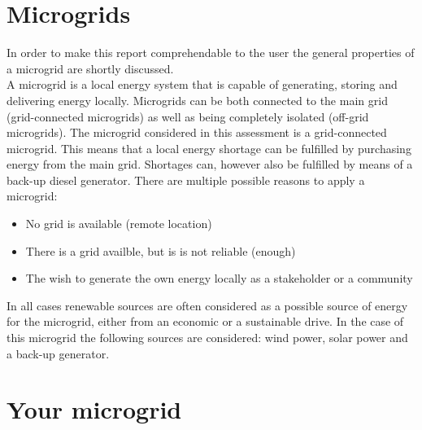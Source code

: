 \documentclass{article}[11pt]
\begin{document}
\begin{large}  \end{large}

\section*{Microgrids}\begin{multicols}{2}\setlength{\parindent}{0pt}

In order to make this report comprehendable to the user the general properties of a microgrid are shortly discussed.\\ A microgrid is a local energy system that is capable of generating, storing and delivering energy locally. Microgrids can be both connected to the main grid (grid-connected microgrids) as well as being completely isolated (off-grid microgrids). The microgrid considered in this assessment is a grid-connected microgrid. This means that a local energy shortage can be fulfilled by purchasing energy from the main grid. Shortages can, however also be fulfilled by means of a back-up diesel generator. There are multiple possible reasons to apply a microgrid: \begin{itemize}

 \item No grid is available (remote location) 

\item There is a grid availble, but is is not reliable (enough)  

\item The wish to generate the own energy locally as a stakeholder or a community 

\end{itemize}

In all cases renewable sources are often considered as a possible source of energy for the microgrid, either from an economic or a sustainable drive. In the case of this microgrid the following sources are considered: wind power, solar power and a back-up generator.

\end{multicols}\section*{Your microgrid}\begin{multicols}{2}\setlength{\parindent}{0pt}


\end{multicols}
\end{document}
